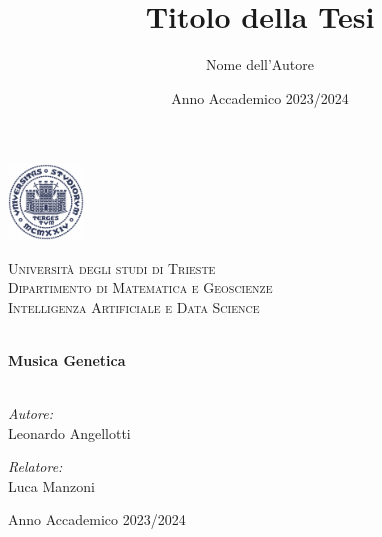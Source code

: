\documentclass[a4paper,12pt]{report}
\title{Titolo della Tesi}
\author{Nome dell'Autore}
\date{Anno Accademico 2023/2024}
\begin{document}
\begin{titlepage}
    \begin{center}
        \includegraphics[width=0.15\textwidth]{units_sigillo.png} 
        \vspace{1cm}
        
        \textsc{\LARGE Università degli studi di Trieste}\\[1.5cm]
        
        \textsc{\Large Dipartimento di Matematica e Geoscienze}\\[0.5cm]
        
        \textsc{\large Intelligenza Artificiale e Data Science}\\[0.5cm]
        
        \vspace{2cm}
        
        \HRule \\[0.4cm]
        { \huge \bfseries Musica Genetica \\[0.4cm] }
        \HRule \\[1.5cm]
        
        \vspace{2cm}
        
        \begin{minipage}{0.4\textwidth}
            \begin{flushleft} \large
                \emph{Autore:}\\
                Leonardo Angellotti
            \end{flushleft}
        \end{minipage}
        \begin{minipage}{0.4\textwidth}
            \begin{flushright} \large
                \emph{Relatore:} \\
                Luca Manzoni
            \end{flushright}
        \end{minipage}
        
        \vfill
        
        {\large Anno Accademico 2023/2024}
        
    \end{center}
\end{titlepage}
\end{document}
